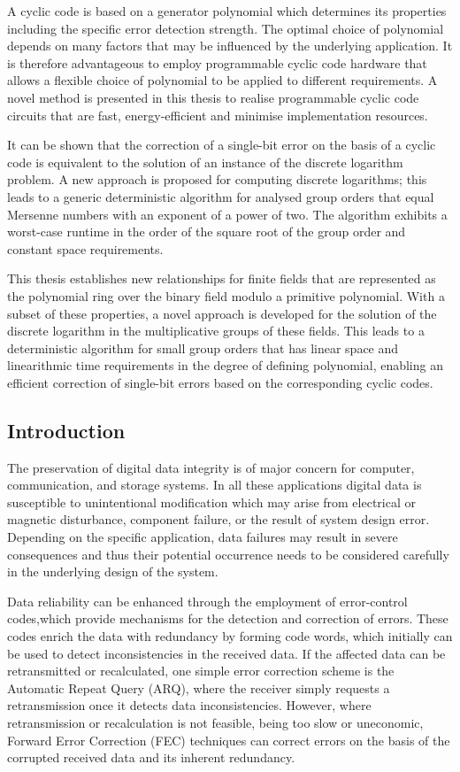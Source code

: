 \documentclass[a4paper, 11pt]{article}
\begin{document}
A cyclic code is based on a generator polynomial which determines its properties including the specific error detection strength. The optimal choice of polynomial depends on many factors that may be influenced by the underlying application. It is therefore advantageous to employ programmable cyclic code hardware that allows a flexible choice of polynomial to be applied to different requirements. A novel method is presented in this thesis to realise programmable cyclic code circuits that are fast, energy-efficient and minimise implementation resources.

It can be shown that the correction of a single-bit error on the basis of a cyclic code is equivalent to the solution of an instance of the discrete logarithm problem. A new approach is proposed for computing discrete logarithms; this leads to a generic deterministic algorithm for analysed group orders that equal Mersenne numbers with an exponent of a power of two. The algorithm exhibits a worst-case runtime in the order of the square root of the group order and constant space requirements.

This thesis establishes new relationships for finite fields that are represented as the polynomial ring over the binary field modulo a primitive polynomial. With a subset of these properties, a novel approach is developed for the solution of the discrete logarithm in the multiplicative groups of these fields. This leads to a deterministic algorithm for small group orders that has linear space and linearithmic time requirements in the degree of defining polynomial, enabling an efficient correction of single-bit errors based on the corresponding cyclic codes.

\subsection{Introduction}
The preservation of digital data integrity is of major concern for computer, communication, and storage systems. In all these applications digital data is susceptible to unintentional modification which may arise from electrical or magnetic disturbance, component failure, or the result of system design error. Depending on the specific application, data failures may result in severe consequences and thus their potential occurrence needs to be considered carefully in the underlying design of the system.

Data reliability can be enhanced through the employment of error-control codes,which provide mechanisms for the detection and correction of errors. These codes enrich the data with redundancy by forming code words, which initially can be used to detect inconsistencies in the received data. If the affected data can be retransmitted or recalculated, one simple error correction scheme is the Automatic Repeat Query (ARQ), where the receiver simply requests a retransmission once it detects data inconsistencies. However, where retransmission or recalculation is not feasible, being too slow or uneconomic, Forward Error Correction (FEC) techniques can correct errors on the basis of the corrupted received data and its inherent redundancy.
\end{document}
